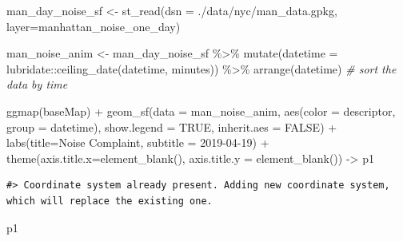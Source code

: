 \documentclass[
  11pt,
]{book}
\newenvironment{Shaded}{\begin{snugshade}}{\end{snugshade}}
\newcommand{\AttributeTok}[1]{\textcolor[rgb]{0.77,0.63,0.00}{#1}}
\newcommand{\CommentTok}[1]{\textcolor[rgb]{0.56,0.35,0.01}{\textit{#1}}}
\newcommand{\ConstantTok}[1]{\textcolor[rgb]{0.00,0.00,0.00}{#1}}
\newcommand{\FunctionTok}[1]{\textcolor[rgb]{0.00,0.00,0.00}{#1}}
\newcommand{\NormalTok}[1]{#1}
\newcommand{\OtherTok}[1]{\textcolor[rgb]{0.56,0.35,0.01}{#1}}
\newcommand{\SpecialCharTok}[1]{\textcolor[rgb]{0.00,0.00,0.00}{#1}}
\newcommand{\StringTok}[1]{\textcolor[rgb]{0.31,0.60,0.02}{#1}}
\begin{document}
\begin{Shaded}
\begin{Highlighting}[]
\NormalTok{man\_day\_noise\_sf }\OtherTok{\textless{}{-}} \FunctionTok{st\_read}\NormalTok{(}\AttributeTok{dsn =} \StringTok{\textquotesingle{}./data/nyc/man\_data.gpkg\textquotesingle{}}\NormalTok{, }
        \AttributeTok{layer=}\StringTok{\textquotesingle{}manhattan\_noise\_one\_day\textquotesingle{}}\NormalTok{)}

\NormalTok{man\_noise\_anim }\OtherTok{\textless{}{-}}\NormalTok{ man\_day\_noise\_sf }\SpecialCharTok{\%\textgreater{}\%} 
                \FunctionTok{mutate}\NormalTok{(}\AttributeTok{datetime =}\NormalTok{ lubridate}\SpecialCharTok{::}\FunctionTok{ceiling\_date}\NormalTok{(datetime, }\StringTok{\textquotesingle{}minutes\textquotesingle{}}\NormalTok{)) }\SpecialCharTok{\%\textgreater{}\%}
                \FunctionTok{arrange}\NormalTok{(datetime)  }\CommentTok{\# sort the data by time}
                       
\FunctionTok{ggmap}\NormalTok{(baseMap) }\SpecialCharTok{+} 
      \FunctionTok{geom\_sf}\NormalTok{(}\AttributeTok{data =}\NormalTok{ man\_noise\_anim, }
              \FunctionTok{aes}\NormalTok{(}\AttributeTok{color =}\NormalTok{ descriptor, }\AttributeTok{group =}\NormalTok{ datetime), }
              \AttributeTok{show.legend =} \ConstantTok{TRUE}\NormalTok{,}
              \AttributeTok{inherit.aes =} \ConstantTok{FALSE}\NormalTok{) }\SpecialCharTok{+}
      \FunctionTok{labs}\NormalTok{(}\AttributeTok{title=}\StringTok{\textquotesingle{}Noise Complaint\textquotesingle{}}\NormalTok{, }\AttributeTok{subtitle =} \StringTok{\textquotesingle{}2019{-}04{-}19\textquotesingle{}}\NormalTok{) }\SpecialCharTok{+}
      \FunctionTok{theme}\NormalTok{(}\AttributeTok{axis.title.x=}\FunctionTok{element\_blank}\NormalTok{(), }
            \AttributeTok{axis.title.y =} \FunctionTok{element\_blank}\NormalTok{()) }\OtherTok{{-}\textgreater{}}\NormalTok{ p1}
\end{Highlighting}
\end{Shaded}

\begin{verbatim}
#> Coordinate system already present. Adding new coordinate system, which will replace the existing one.
\end{verbatim}

\begin{Shaded}
\begin{Highlighting}[]
\NormalTok{p1}
\end{Highlighting}
\end{Shaded}
\end{document}
